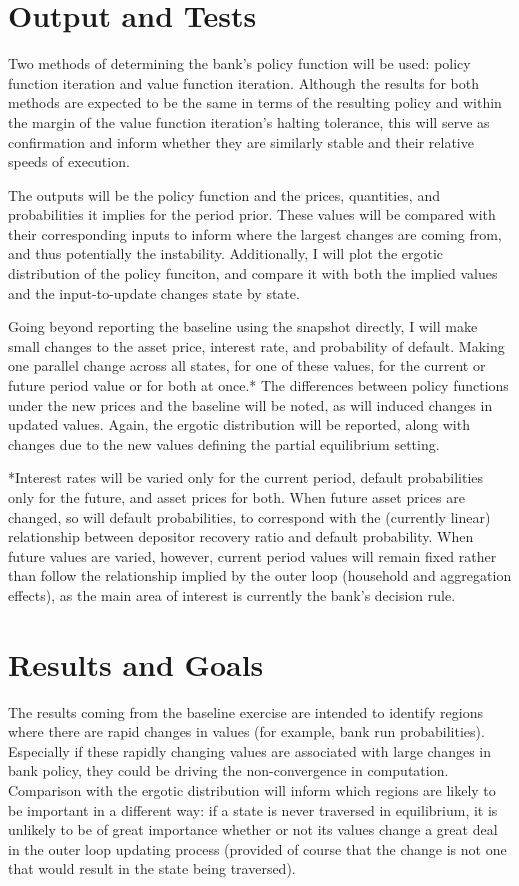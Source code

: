 \documentclass[english]{article}
\begin{document}
\section{Output and Tests}
Two methods of determining the bank's policy function will be used: policy function iteration and 
value function iteration. Although the results for both methods are expected to be the same in terms 
of the resulting policy and within the margin of the value function iteration's halting tolerance, 
this will serve as confirmation and inform whether they are similarly stable and their relative speeds 
of execution. 

The outputs will be the policy function and the prices, quantities, and probabilities it implies for 
the period prior. These values will be compared with their corresponding inputs to inform where 
the largest changes are coming from, and thus potentially the instability. Additionally, I will plot 
the ergotic distribution of the policy funciton, and compare it with both the implied values and the 
input-to-update changes state by state. 

Going beyond reporting the baseline using the snapshot directly, I will make small changes to the asset 
price, interest rate, and probability of default. Making one parallel change across all states, for 
one of these values, for the current or future period value or for both at once.* The differences between 
policy functions under the new prices and the baseline will be noted, as will induced changes in 
updated values. Again, the ergotic distribution will be reported, along with changes due to the new 
values defining the partial equilibrium setting. 

 

*Interest rates will be varied only for the current period, default probabilities only for the future, 
and asset prices for both. When future asset prices are changed, so will default probabilities, to 
correspond with the (currently linear) relationship between depositor recovery ratio and default 
probability. When future values are varied, however, current period values will remain fixed rather 
than follow the relationship implied by the outer loop (household and aggregation effects), as the 
main area of interest is currently the bank's decision rule.

\section{Results and Goals}
The results coming from the baseline exercise are intended to identify regions where there are rapid 
changes in values (for example, bank run probabilities). Especially if these rapidly changing values 
are associated with large changes in bank policy, they could be driving the non-convergence in computation. 
Comparison with the ergotic distribution will inform which regions are likely to be important in a 
different way: if a state is never traversed in equilibrium, it is unlikely to be of great importance 
whether or not its values change a great deal in the outer loop updating process (provided of course 
that the change is not one that would result in the state being traversed).
\end{document}
